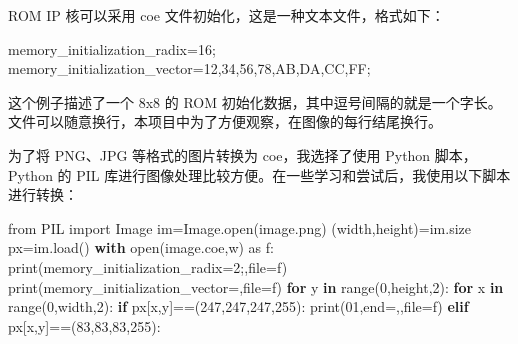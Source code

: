\documentclass[hyperref,UTF8,12pt,a4paper]{ctexart}
\newenvironment{Shaded}{}{}
\newcommand{\BuiltInTok}[1]{#1}
\newcommand{\ControlFlowTok}[1]{\textcolor[rgb]{0.00,0.44,0.13}{\textbf{#1}}}
\newcommand{\DecValTok}[1]{\textcolor[rgb]{0.25,0.63,0.44}{#1}}
\newcommand{\ImportTok}[1]{#1}
\newcommand{\KeywordTok}[1]{\textcolor[rgb]{0.00,0.44,0.13}{\textbf{#1}}}
\newcommand{\NormalTok}[1]{#1}
\newcommand{\OperatorTok}[1]{\textcolor[rgb]{0.40,0.40,0.40}{#1}}
\newcommand{\StringTok}[1]{\textcolor[rgb]{0.25,0.44,0.63}{#1}}
\begin{document}
ROM IP 核可以采用 coe 文件初始化，这是一种文本文件，格式如下：

\begin{Shaded}
\begin{Highlighting}[]
\NormalTok{memory\_initialization\_radix=16;}
\NormalTok{memory\_initialization\_vector=12,34,56,78,AB,DA,CC,FF;}
\end{Highlighting}
\end{Shaded}

这个例子描述了一个 8x8 的 ROM
初始化数据，其中逗号间隔的就是一个字长。文件可以随意换行，本项目中为了方便观察，在图像的每行结尾换行。

为了将 PNG、JPG 等格式的图片转换为 coe，我选择了使用 Python 脚本，Python
的 PIL
库进行图像处理比较方便。在一些学习和尝试后，我使用以下脚本进行转换：

\begin{Shaded}
\begin{Highlighting}[]
\ImportTok{from}\NormalTok{ PIL }\ImportTok{import}\NormalTok{ Image}
\NormalTok{im}\OperatorTok{=}\NormalTok{Image.}\BuiltInTok{open}\NormalTok{(}\StringTok{\textquotesingle{}image.png\textquotesingle{}}\NormalTok{)}
\NormalTok{(width,height)}\OperatorTok{=}\NormalTok{im.size}
\NormalTok{px}\OperatorTok{=}\NormalTok{im.load()}
\ControlFlowTok{with} \BuiltInTok{open}\NormalTok{(}\StringTok{\textquotesingle{}image.coe\textquotesingle{}}\NormalTok{,}\StringTok{\textquotesingle{}w\textquotesingle{}}\NormalTok{) }\ImportTok{as}\NormalTok{ f:}
    \BuiltInTok{print}\NormalTok{(}\StringTok{\textquotesingle{}memory\_initialization\_radix=2;\textquotesingle{}}\NormalTok{,}\BuiltInTok{file}\OperatorTok{=}\NormalTok{f)}
    \BuiltInTok{print}\NormalTok{(}\StringTok{\textquotesingle{}memory\_initialization\_vector=\textquotesingle{}}\NormalTok{,}\BuiltInTok{file}\OperatorTok{=}\NormalTok{f)}
    \ControlFlowTok{for}\NormalTok{ y }\KeywordTok{in} \BuiltInTok{range}\NormalTok{(}\DecValTok{0}\NormalTok{,height,}\DecValTok{2}\NormalTok{):}
        \ControlFlowTok{for}\NormalTok{ x }\KeywordTok{in} \BuiltInTok{range}\NormalTok{(}\DecValTok{0}\NormalTok{,width,}\DecValTok{2}\NormalTok{):}
            \ControlFlowTok{if}\NormalTok{ px[x,y]}\OperatorTok{==}\NormalTok{(}\DecValTok{247}\NormalTok{,}\DecValTok{247}\NormalTok{,}\DecValTok{247}\NormalTok{,}\DecValTok{255}\NormalTok{):}
                \BuiltInTok{print}\NormalTok{(}\StringTok{\textquotesingle{}01\textquotesingle{}}\NormalTok{,end}\OperatorTok{=}\StringTok{\textquotesingle{},\textquotesingle{}}\NormalTok{,}\BuiltInTok{file}\OperatorTok{=}\NormalTok{f)}
            \ControlFlowTok{elif}\NormalTok{ px[x,y]}\OperatorTok{==}\NormalTok{(}\DecValTok{83}\NormalTok{,}\DecValTok{83}\NormalTok{,}\DecValTok{83}\NormalTok{,}\DecValTok{255}\NormalTok{):}

\end{Highlighting}
\end{Shaded}
\end{document}
